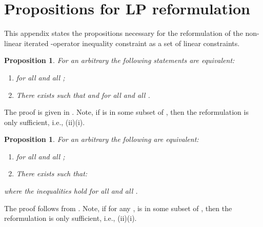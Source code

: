 \documentclass[journal]{IEEEtran}
\newtheorem{proposition}[theorem]{Proposition}
\begin{document}
 




\section{Propositions for LP reformulation} \label{app:LPreformulation_propositions}

This appendix states the propositions necessary for the reformulation of the non-linear iterated -operator inequality constraint as a set of linear constraints.

\vspace{0.1cm}
\begin{proposition} \label{proposition:F_operator_inequality_reformulation}
	For an arbitrary  the following statements are equivalent:
	\vspace{0.1cm}
	\begin{enumerate}
		\renewcommand{\labelenumi}{(\roman{enumi})}
		\item  for all  and all ;
		
		\vspace{0.1cm}
		
		\item There exists  such that  and   for all  and all .
	\end{enumerate}
\end{proposition}
\vspace{0.1cm}
The proof is given in \cite[Theorem 2]{vanroy_decentADP}.
Note, if  is in some subset of , then the reformulation is only sufficient, i.e., (ii)(i).

\vspace{0.1cm}
\begin{proposition} \label{proposition:F_operator_iterated_inequality_reformulation}
	For an arbitrary  the following are equivalent:
	\vspace{0.1cm}
	\begin{enumerate}
		\renewcommand{\labelenumi}{(\roman{enumi})}
		\item  for all  and all ;
		
		\vspace{0.1cm}
		
		\item There exists  such that:

		
	\end{enumerate}
	where the inequalities hold for all  and all .
\end{proposition}
\vspace{0.1cm}
The proof follows from \cite[\S 3.4]{boyd_iteratedBellman}.
Note, if for any ,  is in some subset of , then the reformulation is only sufficient, i.e., (ii)(i). 
\end{document}
